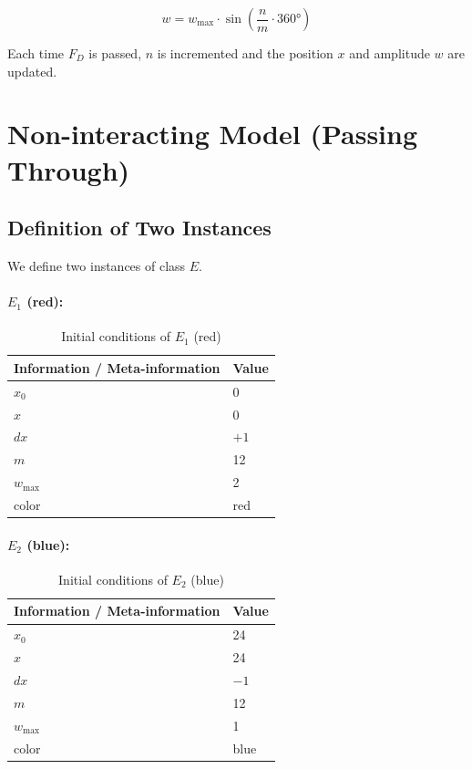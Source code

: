 \documentclass[12pt,a4paper]{article}
\begin{document}
\begin{equation}
  w = w_{\max} \cdot \sin\!\left(\frac{n}{m} \cdot 360°\right)
\end{equation}

Each time $F_D$ is passed, $n$ is incremented and the position $x$ and amplitude $w$ are updated.

\section{Non-interacting Model (Passing Through)}

\subsection{Definition of Two Instances}

We define two instances of class $E$.

\paragraph{$E_1$ (red):}

\begin{table}[h]
  \centering
  \begin{tabular}{@{}ll@{}}
    \toprule
    Information / Meta-information & Value \\
    \midrule
    $x_0$       & 0   \\
    $x$         & 0   \\
    $dx$        & $+1$ \\
    $m$         & 12  \\
    $w_{\max}$  & 2   \\
    color       & red \\
    \bottomrule
  \end{tabular}
  \caption{Initial conditions of $E_1$ (red)}
\end{table}

\paragraph{$E_2$ (blue):}

\begin{table}[h]
  \centering
  \begin{tabular}{@{}ll@{}}
    \toprule
    Information / Meta-information & Value \\
    \midrule
    $x_0$       & 24   \\
    $x$         & 24   \\
    $dx$        & $-1$ \\
    $m$         & 12   \\
    $w_{\max}$  & 1    \\
    color       & blue \\
    \bottomrule
  \end{tabular}
  \caption{Initial conditions of $E_2$ (blue)}
\end{table}
\end{document}
